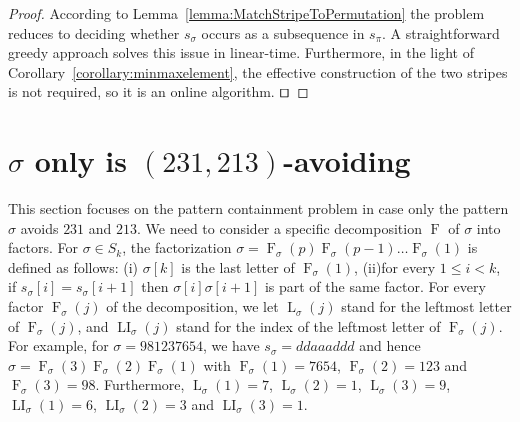 \documentclass[a4paper]{llncs}
\DeclareMathOperator{\AV}{Av}
\newcommand{\pmotif}{\sigma}
\DeclareMathOperator{\firsta}{L}
\newcommand{\first}[2]{\firsta_{{#1}}({#2})}
\DeclareMathOperator{\firstia}{LI}
\newcommand{\firsti}[2]{\firstia_{{#1}}({#2})}
\DeclareMathOperator{\factora}{F}
\newcommand{\factor}[2]{\factora_{{#1}}({#2})}
\begin{document}
\begin{proof}
According to Lemma~\ref{lemma:MatchStripeToPermutation} the problem reduces
to deciding whether $s_\sigma$ occurs as a subsequence in $s_\pi$.
A straightforward greedy approach solves this issue in linear-time.
Furthermore, in the light of Corollary~\ref{corollary:minmaxelement},
the effective construction of the two stripes is not required,
so it is an online algorithm.
$\qed$
\end{proof}


\section{$\sigma$ only is $(231,213)$-avoiding}
\label{section:sigma only avoid 231 and 213}

This section focuses on the pattern containment problem
in case only the pattern $\sigma$ avoids $231$ and $213$.
We need to consider a specific decomposition $\factora$ of $\sigma$ into factors.
For $\sigma \in S_k$, the factorization
$\sigma = \factor{\pmotif}{p} \factor{\pmotif}{p-1} \ldots \factor{\pmotif}{1}$ is defined as follows:
(i) $\sigma[k]$ is the last letter of $\factor{\pmotif}{1}$,
(ii)for every $1 \leq i < k$,
if $s_\sigma[i] = s_\sigma[i+1]$ then
$\sigma[i]\sigma[i+1]$ is part of the same factor.
For every factor $\factor{\pmotif}{j}$ of the decomposition, we let
$\first{\pmotif}{j}$ stand for the leftmost letter of $\factor{\pmotif}{j}$,
and $\firsti{\pmotif}{j}$ stand for the index of the leftmost letter of $\factor{\pmotif}{j}$.
For example,
for $\sigma = 981237654$,
we have
$s_\sigma = ddaaaddd$ and hence
$\sigma = \factor{\pmotif}{3} \factor{\pmotif}{2} \factor{\pmotif}{1}$ with
$\factor{\pmotif}{1} =7654$, $\factor{\pmotif}{2} = 123$ and $\factor{\pmotif}{3} = 98$.
Furthermore,
$\first{\pmotif}{1} = 7$, $\first{\pmotif}{2} = 1$, $\first{\pmotif}{3} = 9$,
$\firsti{\pmotif}{1} = 6$, $\firsti{\pmotif}{2} = 3$ and $\firsti{\pmotif}{3} = 1$.
\end{document}
